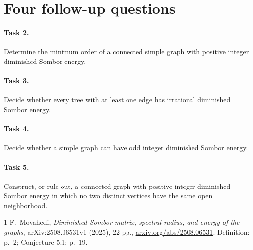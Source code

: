 \documentclass[11pt]{article}
\begin{document}
\section*{Four follow-up questions}
\paragraph{Task 2.} Determine the minimum order of a connected simple
graph with positive integer diminished Sombor energy.
\paragraph{Task 3.} Decide whether every tree with at least one edge
has irrational diminished Sombor energy.
\paragraph{Task 4.} Decide whether a simple graph can have odd integer
diminished Sombor energy.
\paragraph{Task 5.} Construct, or rule out, a connected graph with positive
integer diminished Sombor energy in which no two distinct vertices have
the same open neighborhood.

\begin{thebibliography}{1}
F.~Movahedi, \emph{Diminished Sombor matrix, spectral radius, and energy
of the graphs}, arXiv:2508.06531v1 (2025), 22 pp.,
\href{https://arxiv.org/abs/2508.06531}{arxiv.org/abs/2508.06531}.
Definition: p.~2; Conjecture 5.1: p.~19.
\end{thebibliography}
\end{document}
